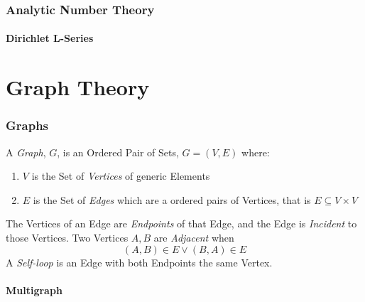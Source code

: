 \documentclass{article}
\begin{document}
\section{Analytic Number Theory}\label{sec:analytic_number_theory}
\subsection{Dirichlet L-Series}\label{subsec:l_series}



\part{Graph Theory}



\section{Graphs} \label{sec:graphs}

A \emph{Graph}, $G$, is an Ordered Pair of Sets, $G = (V,E)$ where:
\begin{enumerate}
\item $V$ is the Set of \emph{Vertices} of generic Elements
\item $E$ is the Set of \emph{Edges} which are a ordered pairs of
  Vertices, that is $E \subseteq V \times V$
\end{enumerate}
The Vertices of an Edge are \emph{Endpoints} of that Edge, and the
Edge is \emph{Incident} to those Vertices. Two Vertices $A,B$ are
\emph{Adjacent} when
\[
    (A,B) \in E \vee (B,A) \in E
\]
A \emph{Self-loop} is an Edge with both Endpoints the same Vertex.



\subsection{Multigraph} \label{subsec:multigraph}
\end{document}
